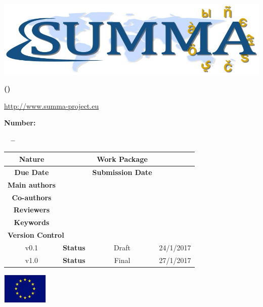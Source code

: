 
\pagestyle{fancy}
\chead{}
\lfoot{}
\rfoot{}\rhead{\DeliverableNumber\ \DeliverableName}
\setlength{\headheight}{16pt}
\renewcommand{\headrulewidth}{2.0pt}
\renewcommand{\footrulewidth}{2.0pt}

\renewcommand\arraystretch{1.1}


	\hfill
	\centerline{\includegraphics[width=\textwidth]{./images/SummaLogoFinal.jpg}}

	\bigskip
	\begin{center}
	\textbf{\LARGE\sffamily \ProjectTitle}
	
	\smallskip
	\textbf{\LARGE\sffamily(\ProjectAcronym)}
	
	\smallskip
	{\large \url{http://www.summa-project.eu}}

	\bigskip
	\textbf{\Large {\FundingScheme}}

	\smallskip
	\textbf{\Large Number: \GrantNo}

	\smallskip
	\textbf{\Large \DeliverableNumber ~ -- ~\DeliverableName}

	\end{center}


	\bigskip
	\begin{center}
	\begin{tabular}{|c|c|c|m{5.0cm}|}
	\hline
	\textbf{Nature} & \DeliverableNature & \textbf{Work Package} & \Workpackage \\ \hline

	\textbf{Due Date}  &  \DeliverableDueDate & \textbf{Submission Date}  & \DeliverableSubmissionDate \\ \hline

	\textbf{Main authors}  & \multicolumn{3}{|l|}{\MainAuthor} \\ \hline

	\textbf{Co-authors} & \multicolumn{3}{|p{120mm}|}{\CoAuthors} \\ \hline

	\textbf{Reviewers}  & \multicolumn{3}{|l|}{\Reviewers}  \\ \hline
 
	\textbf{Keywords}  & \multicolumn{3}{|l|}{\Keywords}\\ \hline
	
	\multicolumn{4}{|l|}{\textbf{Version Control}}\\ \hline
	
	v0.1 & \textbf{Status} & Draft & 24/1/2017 \\ \hline
    v1.0 & \textbf{Status} & Final & 27/1/2017 \\ \hline
\end{tabular}
	\end{center}


\vfill
\centerline{\includegraphics[height=1.5cm]{./images/EU_flag.jpg}}
\clearpage
